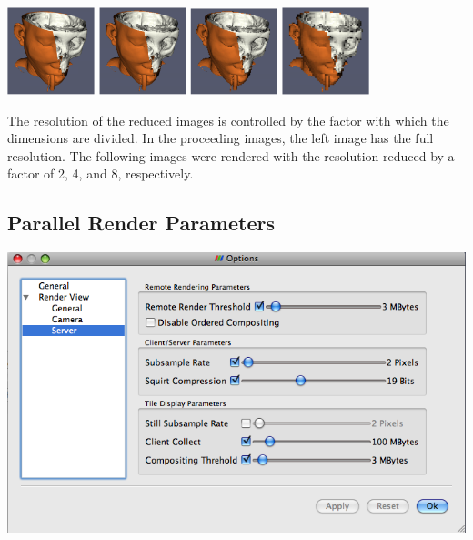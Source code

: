 \begin{inlinefig}
  \includegraphics[width=1in]{images/ImageLODFull}
  \includegraphics[width=1in]{images/ImageLOD2}
  \includegraphics[width=1in]{images/ImageLOD4}
  \includegraphics[width=1in]{images/ImageLOD8}
\end{inlinefig}

The resolution of the reduced images is controlled by the factor with which
the dimensions are divided.  In the proceeding images, the left image has
the full resolution.  The following images were rendered with the
resolution reduced by a factor of 2, 4, and 8, respectively.

\subsection{Parallel Render Parameters}

\begin{inlinefig}
  \includegraphics[width=\scw]{images/SettingsServer}
\end{inlinefig}


